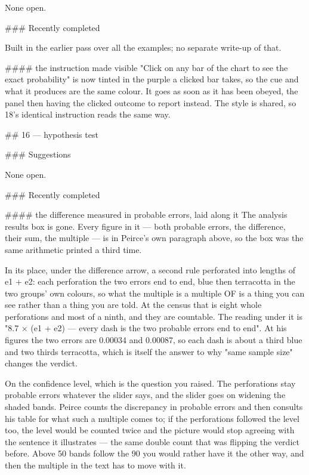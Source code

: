 None open.

### Recently completed

Built in the earlier pass over all the examples; no separate write-up of that.

#### the instruction made visible
"Click on any bar of the chart to see the exact probability" is now tinted in
the purple a clicked bar takes, so the cue and what it produces are the same
colour. It goes as soon as it has been obeyed, the panel then having the clicked
outcome to report instead. The style is shared, so 18's identical instruction
reads the same way.


## 16 — hypothesis test

### Suggestions

None open.

### Recently completed

#### the difference measured in probable errors, laid along it
The analysis results box is gone. Every figure in it — both probable errors, the
difference, their sum, the multiple — is in Peirce's own paragraph above, so the
box was the same arithmetic printed a third time.

In its place, under the difference arrow, a second rule perforated into lengths
of e1 + e2: each perforation the two errors end to end, blue then terracotta in
the two groups' own colours, so what the multiple is a multiple OF is a thing
you can see rather than a thing you are told. At the census that is eight whole
perforations and most of a ninth, and they are countable. The reading under it
is "8.7 × (e1 + e2) — every dash is the two probable errors end to end". At his
figures the two errors are 0.00034 and 0.00087, so each dash is about a third
blue and two thirds terracotta, which is itself the answer to why "same sample
size" changes the verdict.

On the confidence level, which is the question you raised. The perforations stay
probable errors whatever the slider says, and the slider goes on widening the
shaded bands. Peirce counts the discrepancy in probable errors and then consults
his table for what such a multiple comes to; if the perforations followed the
level too, the level would be counted twice and the picture would stop agreeing
with the sentence it illustrates — the same double count that was flipping the
verdict before. Above 50%
bands follow the 90%
you would rather have it the other way, and then the multiple in the text has to
move with it.

